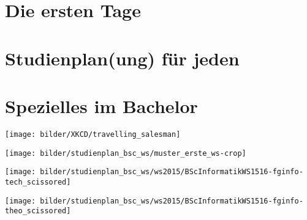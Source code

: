 \documentclass[]{papertex}
\begin{document}
	\thispagestyle{empty}
	\clearpage
	\setcounter{page}{1}
	\tableofcontents
	\newpage
	\section{Die ersten Tage}
		
	\newpage
	\section{Studienplan(ung) für jeden}
		\label{studienplan}
		\begin{multicols}{2}
		
		\end{multicols}
	\newpage
	\section{Spezielles im Bachelor}
		\label{bachelor}
		\begin{multicols}{2}
		\end{multicols}
		\newpage
		\newpage
		\begin{multicols}{2}
		\end{multicols}
		\begin{center}
		\texttt{[image: bilder/XKCD/travelling\_salesman]}
		\end{center}
		\begin{minipage}[H]{1.0\linewidth}
			\begin{center}     
			\label{musterstudienplan}
			\texttt{[image: bilder/studienplan\_bsc\_ws/muster\_erste\_ws-crop]}
			\end{center}  
		\end{minipage}
		\newpage
		\begin{minipage}[H]{1.0\linewidth}
		\begin{center} 
  			\texttt{[image: bilder/studienplan\_bsc\_ws/ws2015/BScInformatikWS1516-fginfo-tech\_scissored]}
  			\label{studienplan_tech}
		\end{center}
		\end{minipage}
		\newpage
		\begin{minipage}[H]{1.0\linewidth}
		\begin{center} 
  			\texttt{[image: bilder/studienplan\_bsc\_ws/ws2015/BScInformatikWS1516-fginfo-theo\_scissored]}
  			\label{studienplan_theo}
		\end{center}
		\end{minipage}
	
\end{document}
